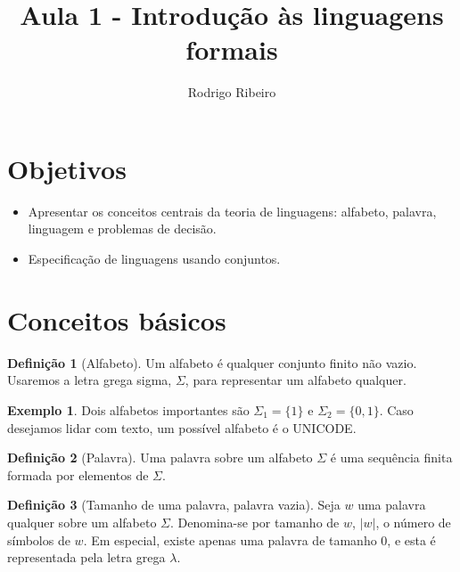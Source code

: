 \documentclass[a4paper]{article}
\theoremstyle{definition}
\newtheorem{Example}{Exemplo}
\newtheorem{Definition}{Definição}
\begin{document}
  \title{Aula 1 - Introdução às linguagens formais}
  \author{Rodrigo Ribeiro}

  \maketitle


  \pagestyle{fancy}


  \section*{Objetivos}

  \begin{itemize}
     \item Apresentar os conceitos centrais da teoria de
       linguagens: alfabeto, palavra, linguagem e
       problemas de decisão.
     \item Especificação de linguagens usando conjuntos.
  \end{itemize}

  \section{Conceitos básicos}

  \begin{Definition}[Alfabeto]
    Um alfabeto é qualquer conjunto finito não vazio. Usaremos a letra grega
    sigma, $\Sigma$, para representar um alfabeto qualquer.
  \end{Definition}

  \begin{Example}
    Dois alfabetos importantes são $\Sigma_1= \{1\}$ e $\Sigma_2 =\{0,1\}$. Caso
    desejamos lidar com texto, um possível alfabeto é o UNICODE.
  \end{Example}

  \begin{Definition}[Palavra]
    Uma palavra sobre um alfabeto $\Sigma$ é uma sequência
    finita formada por elementos de $\Sigma$.
  \end{Definition}

  \begin{Definition}[Tamanho de uma palavra, palavra vazia]
    Seja $w$ uma palavra qualquer sobre um alfabeto $\Sigma$. Denomina-se
    por tamanho de $w$, $|w|$, o número de símbolos de $w$. Em especial,
    existe apenas uma palavra de tamanho $0$, e esta é representada pela
    letra grega $\lambda$.
  \end{Definition}
\end{document}
